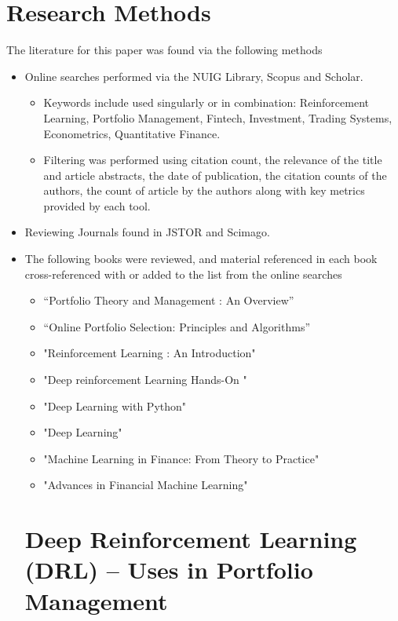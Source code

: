 \documentclass[oneside,12pt]{Classes/RoboticsLaTeX}
\begin{document}
\section{Research Methods}
The literature for this paper was found via the following methods
\begin{itemize}
\item Online searches performed via the NUIG Library, Scopus and Scholar.
    \begin{itemize}
    \item Keywords include used singularly or in combination: Reinforcement Learning, Portfolio Management, Fintech, Investment, Trading Systems, Econometrics, Quantitative Finance.
    \item Filtering was performed using citation count, the relevance of the title and article abstracts, the date of publication, the citation counts of the authors, the count of article by the authors along with key metrics provided by each tool.
    \end{itemize}
\item Reviewing Journals found in JSTOR and Scimago.
\item The following books were reviewed, and material referenced in each book cross-referenced with or added to the list from the online searches
    \begin{itemize}
    \item “Portfolio Theory and Management : An Overview” \citep{BakerH.Kent2013PTaM}
    \item “Online Portfolio Selection: Principles and Algorithms” \citep{LiBin2016OPSP}
    \item "Reinforcement Learning : An Introduction" \citep{SuttonRichardS.2018Rl:a}
    \item "Deep reinforcement Learning Hands-On " \citep{LapanMaxim2020Drlh}
    \item "Deep Learning with Python" \citep{CholletF2018DlwP}
    \item "Deep Learning" \citep{GoodfellowIan2016Dl}
    \item "Machine Learning in Finance: From Theory to Practice" \citep{DixonMatthewF2020MLiF}
    \item "Advances in Financial Machine Learning" \citep{dePradoMarcos2018AiFM}
\end{itemize}

\section{Deep Reinforcement Learning (DRL)  – Uses in Portfolio Management}

\end{itemize}
\end{document}
